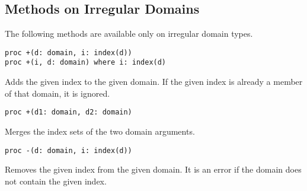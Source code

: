 
\subsection{Methods on Irregular Domains}

The following methods are available only on irregular domain types.

\begin{protohead}
\begin{verbatim}
proc +(d: domain, i: index(d))
proc +(i, d: domain) where i: index(d)
\end{verbatim}
\end{protohead}
\begin{protobody}
Adds the given index to the given domain.  If the given index is already a
member of that domain, it is ignored.
\end{protobody}

\begin{protohead}
\begin{verbatim}
proc +(d1: domain, d2: domain)
\end{verbatim}
\end{protohead}
\begin{protobody}
Merges the index sets of the two domain arguments.
\end{protobody}

\begin{protohead}
\begin{verbatim}
proc -(d: domain, i: index(d))
\end{verbatim}
\end{protohead}
\begin{protobody}
Removes the given index from the given domain.  It is an error if the domain
does not contain the given index.
\end{protobody}

